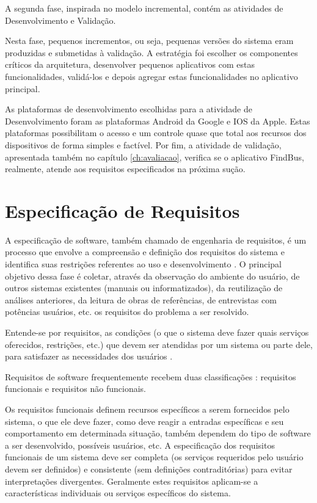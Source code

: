 A segunda fase, inspirada no modelo incremental, contém as atividades de Desenvolvimento e Validação.

Nesta fase, pequenos incrementos, ou seja, pequenas versões do sistema eram produzidas e submetidas à validação. A estratégia foi escolher os componentes críticos da arquitetura, desenvolver pequenos aplicativos com estas funcionalidades, validá-los e depois agregar estas funcionalidades no aplicativo principal.

As plataformas de desenvolvimento escolhidas para a atividade de Desenvolvimento foram as plataformas Android da Google e IOS da Apple. Estas plataformas possibilitam o acesso e um controle quase que total aos recursos dos dispositivos de forma simples e factível. Por fim, a atividade de validação, apresentada também no capítulo \ref{ch:avaliacao}, verifica se o aplicativo FindBus, realmente, atende aos requisitos especificados na próxima sução.

\section{Especificação de Requisitos}
\label{sc:EspecificacaoRequisitos}

A especificação de software, também chamado de engenharia de requisitos, é um processo que envolve a compreensão e definição dos requisitos do sistema e identifica suas restrições referentes ao uso e desenvolvimento \citep{SOMMERVILLE2011}. O principal objetivo dessa fase é coletar, através da observação do ambiente do usuário, de outros sistemas existentes (manuais ou informatizados), da reutilização de análises anteriores, da leitura de obras de referências, de entrevistas com potências usuários, etc. os requisitos do problema a ser resolvido.

Entende-se por requisitos, as condições (o que o sistema deve fazer quais serviços oferecidos, restrições, etc.) que devem ser atendidas por um sistema ou parte dele, para satisfazer as necessidades dos usuários \citep{bezerra2007}.

Requisitos de software frequentemente recebem duas classificações \citep{SOMMERVILLE2011}: requisitos funcionais e requisitos não funcionais.

Os requisitos funcionais definem recursos específicos a serem fornecidos pelo sistema, o que ele deve fazer, como deve reagir a entradas específicas e seu comportamento em determinada situação, também dependem do tipo de software a ser desenvolvido, possíveis usuários, etc. A especificação dos requisitos funcionais de um sistema deve ser completa (os serviços requeridos pelo usuário devem ser definidos) e consistente (sem definições contraditórias) para evitar interpretações divergentes. Geralmente estes requisitos aplicam-se a características individuais ou serviços específicos do sistema.

